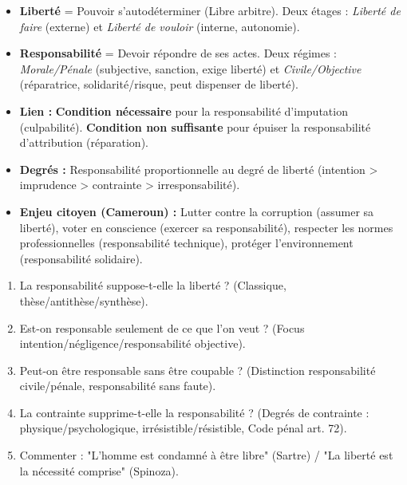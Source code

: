 \documentclass[11pt]{article}
\begin{document}
\begin{aretenir}
\begin{itemize}
    \item \textbf{Liberté} = Pouvoir s'autodéterminer (Libre arbitre). Deux étages : \emph{Liberté de faire} (externe) et \emph{Liberté de vouloir} (interne, autonomie).
    \item \textbf{Responsabilité} = Devoir répondre de ses actes. Deux régimes : \emph{Morale/Pénale} (subjective, sanction, exige liberté) et \emph{Civile/Objective} (réparatrice, solidarité/risque, peut dispenser de liberté).
    \item \textbf{Lien :} \textbf{Condition nécessaire} pour la responsabilité d'imputation (culpabilité). \textbf{Condition non suffisante} pour épuiser la responsabilité d'attribution (réparation).
    \item \textbf{Degrés :} Responsabilité proportionnelle au degré de liberté (intention > imprudence > contrainte > irresponsabilité).
    \item \textbf{Enjeu citoyen (Cameroun) :} Lutter contre la corruption (assumer sa liberté), voter en conscience (exercer sa responsabilité), respecter les normes professionnelles (responsabilité technique), protéger l'environnement (responsabilité solidaire).
\end{itemize}
\end{aretenir}

\begin{exercice}
\begin{enumerate}
    \item \og La responsabilité suppose-t-elle la liberté ? \fg{} (Classique, thèse/antithèse/synthèse).
    \item \og Est-on responsable seulement de ce que l'on veut ? \fg{} (Focus intention/négligence/responsabilité objective).
    \item \og Peut-on être responsable sans être coupable ? \fg{} (Distinction responsabilité civile/pénale, responsabilité sans faute).
    \item \og La contrainte supprime-t-elle la responsabilité ? \fg{} (Degrés de contrainte : physique/psychologique, irrésistible/résistible, Code pénal art. 72).
    \item \og Commenter : "L'homme est condamné à être libre" (Sartre) / "La liberté est la nécessité comprise" (Spinoza). \fg{}
\end{enumerate}
\end{exercice}
\end{document}

